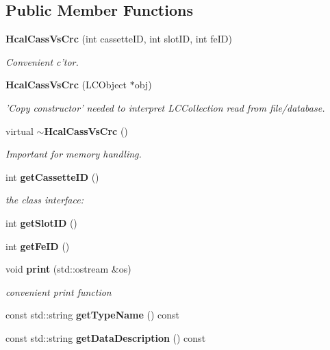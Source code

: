 \subsection*{Public Member Functions}
\begin{DoxyCompactItemize}
\item 
{\bf Hcal\-Cass\-Vs\-Crc} (int cassette\-I\-D, int slot\-I\-D, int fe\-I\-D)\label{classCALICE_1_1HcalCassVsCrc_acac3879060b6b68debe0a745edd6aee4}

\begin{DoxyCompactList}\small\item\em Convenient c'tor. \end{DoxyCompactList}\item 
{\bf Hcal\-Cass\-Vs\-Crc} (L\-C\-Object $\ast$obj)\label{classCALICE_1_1HcalCassVsCrc_a8a358967f908bb95a3d91b1d146c29d5}

\begin{DoxyCompactList}\small\item\em 'Copy constructor' needed to interpret L\-C\-Collection read from file/database. \end{DoxyCompactList}\item 
virtual {\bf $\sim$\-Hcal\-Cass\-Vs\-Crc} ()\label{classCALICE_1_1HcalCassVsCrc_a8a97f7c3778a20a0c5b07d7698ac1b98}

\begin{DoxyCompactList}\small\item\em Important for memory handling. \end{DoxyCompactList}\item 
int {\bf get\-Cassette\-I\-D} ()\label{classCALICE_1_1HcalCassVsCrc_ad4aefc286108f1142bec4cf745a40688}

\begin{DoxyCompactList}\small\item\em the class interface\-: \end{DoxyCompactList}\item 
int {\bfseries get\-Slot\-I\-D} ()\label{classCALICE_1_1HcalCassVsCrc_a369e980573265ca9b9db146b9e218ba3}

\item 
int {\bfseries get\-Fe\-I\-D} ()\label{classCALICE_1_1HcalCassVsCrc_a9fafc4450edc42942bc6e27400694709}

\item 
void {\bf print} (std\-::ostream \&os)\label{classCALICE_1_1HcalCassVsCrc_aff5276505cb70e00d8fd8da08a3bc340}

\begin{DoxyCompactList}\small\item\em convenient print function \end{DoxyCompactList}\item 
const std\-::string {\bfseries get\-Type\-Name} () const \label{classCALICE_1_1HcalCassVsCrc_a7e060dc4ae6b98c7881e8de228802932}

\item 
const std\-::string {\bfseries get\-Data\-Description} () const \label{classCALICE_1_1HcalCassVsCrc_a70190ce23db321e7cd2ae283eb2c1f12}

\end{DoxyCompactItemize}


